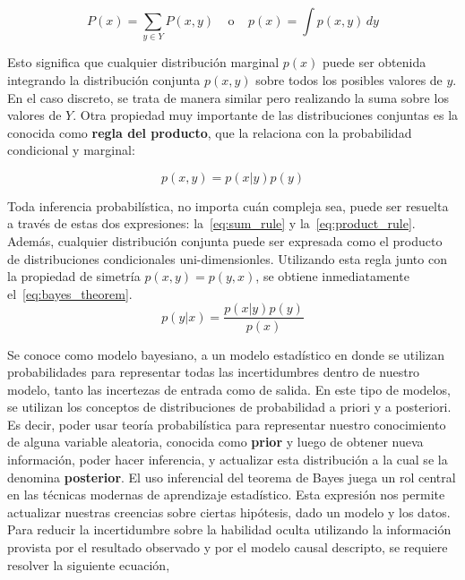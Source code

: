 \documentclass[11pt,twoside,spanish]{report} %
\begin{document}
\begin{equation} \label{eq:sum_rule}
\tag{regla de la suma}
P(x) = \sum_{y \in Y} P(x,y) \ \ \ \ \ \text{o} \ \ \ \ \ p(x) = \int p(x,y) \, dy
\end{equation}

Esto significa que cualquier distribuci\'on marginal $p(x)$ puede ser obtenida integrando la distribuci\'on conjunta $p(x,y)$ sobre todos los posibles valores de $y$. 
En el caso discreto, se trata de manera similar pero realizando la suma sobre los valores de $Y$.
Otra propiedad muy importante de las distribuciones conjuntas es la conocida como \textbf{regla del producto}, que la relaciona con la probabilidad condicional y marginal:

\begin{equation}\label{eq:product_rule}
\tag{regla del producto}
p(x,y) = p(x|y) p(y)
\end{equation}

Toda inferencia probabil\'istica, no importa cu\'an compleja sea, puede ser resuelta a trav\'es de estas dos expresiones: la~\ref{eq:sum_rule} y la~\ref{eq:product_rule}.
Adem\'as, cualquier distribuci\'on conjunta puede ser expresada como el producto de distribuciones condicionales uni-dimensionles.
Utilizando esta regla junto con la propiedad de simetr\'ia $p(x,y) = p(y,x)$, se obtiene inmediatamente el~\ref{eq:bayes_theorem}.
%
\begin{equation}\label{eq:bayes_theorem}
\tag{teorema de Bayes}
p(y|x) = \frac{p(x|y)p(y)}{p(x)}
\end{equation}
%

Se conoce como modelo bayesiano, a un modelo estad\'istico en donde se utilizan probabilidades para representar todas las incertidumbres dentro de nuestro modelo, tanto las incertezas de entrada como de salida.
En este tipo de modelos, se utilizan los conceptos de distribuciones de probabilidad a priori y a posteriori.
Es decir, poder usar teor\'ia probabil\'istica para representar nuestro conocimiento de alguna variable aleatoria, conocida como \textbf{prior} y luego de obtener nueva informaci\'on, poder hacer inferencia, y actualizar esta distribuci\'on a la cual se la denomina \textbf{posterior}.
El uso inferencial del teorema de Bayes juega un rol central en las t\'ecnicas modernas de aprendizaje estad\'istico.
Esta expresi\'on nos permite actualizar nuestras creencias sobre ciertas hip\'otesis, dado un modelo y los datos.
Para reducir la incertidumbre sobre la habilidad oculta utilizando la informaci\'on provista por el resultado observado y por el modelo causal descripto, se requiere resolver la siguiente ecuaci\'on,
\end{document}
